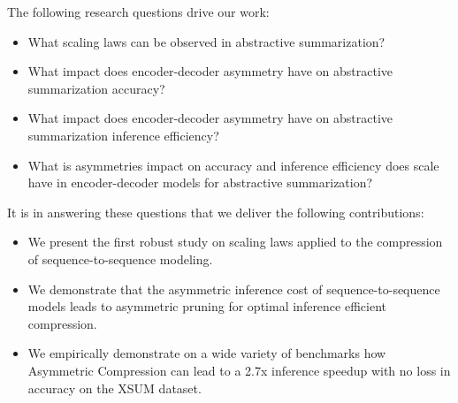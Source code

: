 The following research questions drive our work: 
\begin{itemize}
    \item What scaling laws can be observed in abstractive summarization?
    \item What impact does encoder-decoder asymmetry have on abstractive summarization accuracy? 
    \item What impact does encoder-decoder asymmetry have on abstractive summarization inference efficiency?
    \item What is asymmetries impact on accuracy and inference efficiency does scale have in encoder-decoder models for abstractive summarization? 
\end{itemize}
It is in answering these questions that we deliver the following contributions: 
\begin{itemize}
\item We present the first robust study on scaling laws applied to the compression of sequence-to-sequence modeling. 
\item We demonstrate that the asymmetric inference cost of sequence-to-sequence models leads to asymmetric pruning for optimal inference efficient compression.
\item We empirically demonstrate on a wide variety of benchmarks how Asymmetric Compression can lead to a 2.7x inference speedup with no loss in accuracy on the XSUM dataset.
\end{itemize}